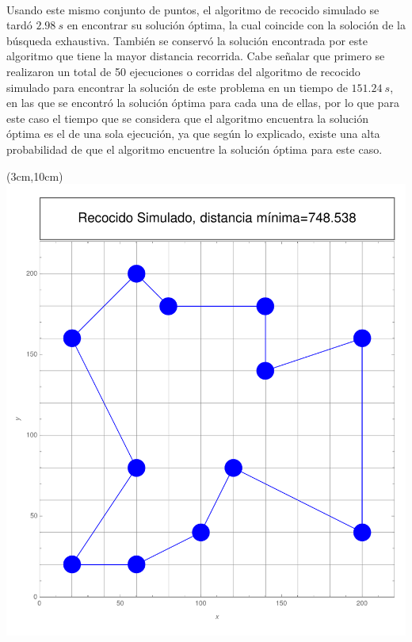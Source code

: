 \documentclass[11pt, table]{report}
\begin{document}
{\

\pagebreak

Usando este mismo conjunto de puntos, el algoritmo de recocido simulado se tardó $2.98\ s$ en encontrar su solución óptima, la cual coincide con la soloción de la búsqueda exhaustiva. También se conservó la solución encontrada por este algoritmo que tiene la mayor distancia recorrida. Cabe señalar que primero se realizaron un total de 50 ejecuciones o corridas del algoritmo de recocido simulado para encontrar la solución de este problema en un tiempo de $151.24\ s$, en las que se encontró la solución óptima para cada una de ellas, por lo que para este caso el tiempo que se considera que el algoritmo encuentra la solución óptima es el de una sola ejecución, ya que según lo explicado, existe una alta probabilidad de que el algoritmo encuentre la solución óptima para este caso.

\begin{textblock*}{\textwidth}(3cm,10cm)
\includegraphics[scale=0.65]{recocido_simulado_min.pdf}
\end{textblock*}

\

\pagebreak

}
\end{document}
